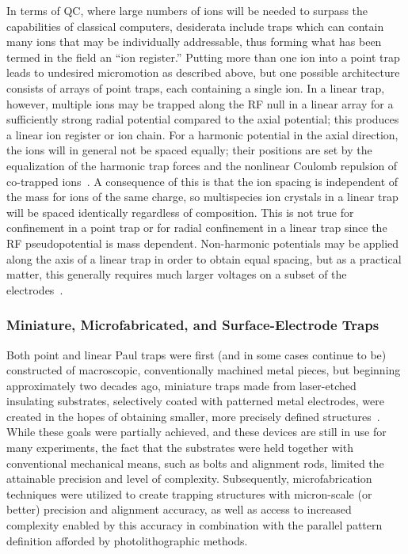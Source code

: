 \documentclass[%
12pt,
 amsmath,amssymb,
]{revtex4-2}
\begin{document}
In terms of QC, where large numbers of ions will be needed to surpass the capabilities of classical computers, desiderata include traps which can contain many ions that may be individually addressable, thus forming what has been termed in the field an ``ion register.''  Putting more than one ion into a point trap leads to undesired micromotion as described above, but one possible architecture consists of arrays of point traps, each containing a single ion.  In a linear trap, however, multiple ions may be trapped along the RF null in a linear array for a sufficiently strong radial potential compared to the axial potential; this produces a linear ion register or ion chain.  For a harmonic potential in the axial direction, the ions will in general not be spaced equally; their positions are set by the equalization of the harmonic trap forces and the nonlinear Coulomb repulsion of co-trapped ions~\cite{James1998}.  A consequence of this is that the ion spacing is independent of the mass for ions of the same charge, so multispecies ion crystals in a linear trap will be spaced identically regardless of composition.  This is not true for confinement in a point trap or for radial confinement in a linear trap since the RF pseudopotential is mass dependent.  Non-harmonic potentials may be applied along the axis of a linear trap in order to obtain equal spacing, but as a practical matter, this generally requires much larger voltages on a subset of the electrodes~\cite{PaganoCryoChains2018}.

\subsubsection{Miniature, Microfabricated, and Surface-Electrode Traps}
\label{MicroTraps}

Both point and linear Paul traps were first (and in some cases continue to be) constructed of macroscopic, conventionally machined metal pieces, but beginning approximately two decades ago, miniature traps made from laser-etched insulating substrates, selectively coated with patterned metal electrodes, were created in the hopes of obtaining smaller, more precisely defined structures~\cite{NIST:ion_transport:2002}.  While these goals were partially achieved, and these devices are still in use for many experiments, the fact that the substrates were held together with conventional mechanical means, such as bolts and alignment rods, limited the attainable precision and level of complexity.  Subsequently, microfabrication techniques were utilized to create trapping structures with micron-scale (or better) precision and alignment accuracy, as well as access to increased complexity enabled by this accuracy in combination with the parallel pattern definition afforded by photolithographic methods.
\end{document}
